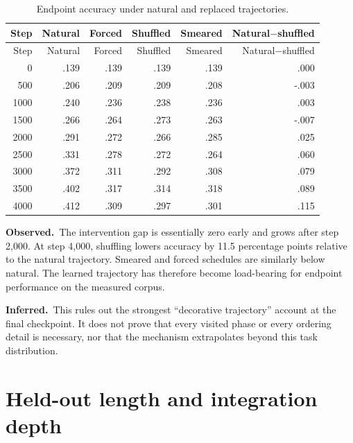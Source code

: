 \documentclass[10pt]{article}
\newcommand{\obs}{\textbf{Observed.}\ }
\newcommand{\inferlabel}{\textbf{Inferred.}\ }
\begin{document}
\begin{longtable}{rrrrrr}
\caption{Endpoint accuracy under natural and replaced trajectories.}\\
\toprule
Step & Natural & Forced & Shuffled & Smeared & Natural$-$shuffled \\
\midrule
\endfirsthead
\toprule
Step & Natural & Forced & Shuffled & Smeared & Natural$-$shuffled \\
\midrule
\endhead
0    & .139 & .139 & .139 & .139 & .000 \\
500  & .206 & .209 & .209 & .208 & -.003 \\
1000 & .240 & .236 & .238 & .236 & .003 \\
1500 & .266 & .264 & .273 & .263 & -.007 \\
2000 & .291 & .272 & .266 & .285 & .025 \\
2500 & .331 & .278 & .272 & .264 & .060 \\
3000 & .372 & .311 & .292 & .308 & .079 \\
3500 & .402 & .317 & .314 & .318 & .089 \\
4000 & .412 & .309 & .297 & .301 & .115 \\
\bottomrule
\end{longtable}

\obs The intervention gap is essentially zero early and grows after step 2,000.
At step 4,000, shuffling lowers accuracy by 11.5 percentage points relative to
the natural trajectory. Smeared and forced schedules are similarly below
natural. The learned trajectory has therefore become load-bearing for endpoint
performance on the measured corpus.

\inferlabel This rules out the strongest ``decorative trajectory'' account at the final
checkpoint. It does not prove that every visited phase or every ordering detail
is necessary, nor that the mechanism extrapolates beyond this task distribution.

\section{Held-out length and integration depth}
\end{document}
